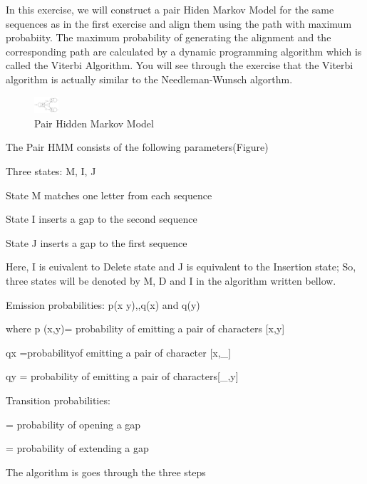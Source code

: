 \documentclass[a4paper,11pt]{article}
\DeclareRobustCommand{\greektext}{%
  \fontencoding{LGR}\selectfont\def\encodingdefault{LGR}}
\DeclareRobustCommand{\textgreek}[1]{\leavevmode{\greektext #1}}
\begin{document}
In this exercise, we will construct a pair Hiden Markov Model for
the same sequences as in the first exercise and align them using the
path with maximum probabiity. The maximum probability of generating
the alignment and the corresponding path are calculated by a dynamic
programming algorithm which is called the Viterbi Algorithm. You will
see through the exercise that the Viterbi algorithm is actually similar
to the Needleman-Wunsch algorthm.

%
\begin{figure}[h]
\begin{center}
\includegraphics[width=0.08\textwidth]{HMM.jpg}\caption{Pair Hidden Markov Model}

\end{center}

%
\end{figure}


The Pair HMM consists of the following parameters(Figure)

\vspace{0.5cm}

Three states: M, I, J

State M matches one letter from each sequence

State I inserts a gap to the second sequence

State J inserts a gap to the first sequence 


Here, I is euivalent to Delete state and J is equivalent to the Insertion state;
So, three states will be denoted by M, D and I in the algorithm written bellow.
\vspace{0.5cm}

Emission probabilities: p(x y),,q(x) and q(y)

where p (x,y)= probability of emitting a pair of characters {[}x,y{]}

qx =probabilityof emitting a pair of character {[}x,\_{]}

qy = probability of emitting a pair of characters{[}\_,y{]}

\vspace{0.5cm}

Transition probabilities:

\textgreek{d} = probability of opening a gap

\textgreek{e} = probability of extending a gap

The algorithm is goes through the three steps
\end{document}

